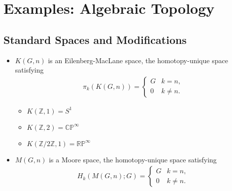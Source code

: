 \hypertarget{examples-algebraic-topology}{%
\section{Examples: Algebraic
Topology}\label{examples-algebraic-topology}}

\hypertarget{standard-spaces-and-modifications}{%
\subsection{Standard Spaces and
Modifications}\label{standard-spaces-and-modifications}}

\begin{itemize}
\item
  \(K(G, n)\) is an Eilenberg-MacLane space, the homotopy-unique space
  satisfying
  \begin{align*}
  \pi_k(K(G, n)) = 
  \begin{cases}
  G & k=n, \\ 
  0 & k\neq n.
  \end{cases}
  \end{align*}

  \begin{itemize}
  \tightlist
  \item
    \(K({\mathbb{Z}}, 1) = S^1\)
  \item
    \(K({\mathbb{Z}}, 2) = {\mathbb{CP}}^\infty\)
  \item
    \(K({\mathbb{Z}}/2{\mathbb{Z}}, 1) = {\mathbb{RP}}^\infty\)
  \end{itemize}
\item
  \(M(G, n)\) is a Moore space, the homotopy-unique space satisfying
  \begin{align*}
  H_k(M(G, n); G) = 
  \begin{cases}
  G & k=n, \\ 
  0 & k\neq n.
  \end{cases}
  \end{align*}


\end{itemize}
